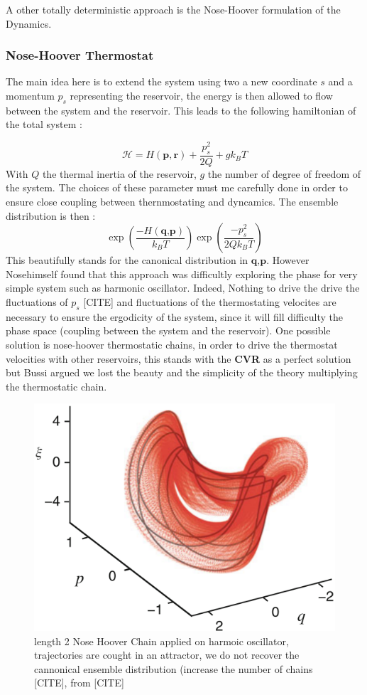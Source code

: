 \documentclass[ansiapaper]{report}
\begin{document}
\begin{multicols}{3}
A other totally deterministic approach is the Nose-Hoover formulation of the Dynamics.

\subsubsection{Nose-Hoover Thermostat}
The main idea here is to extend the system using two a new coordinate $s$ and a momentum $p_s$ representing the reservoir, the energy is then allowed to flow between the system and the reservoir. This leads to the following hamiltonian of the total system :

$$\mathcal{H} = H(\textbf{p}, \textbf{r}) + \frac{p_s^2}{2Q} + gk_BT$$
With $Q$ the thermal inertia of the reservoir, $g$ the number of degree of freedom of the system. The choices of these parameter must me carefully done in order to ensure close coupling between thernmostating and dyncamics. The ensemble distribution is then :
$$\exp(\frac{-H(\textbf{q,p})}{k_BT}) \exp(\frac{-p_s^2}{2Qk_BT})$$
This beautifully stands for the canonical distribution in $\textbf{q,p}$. However Nosehimself found that this approach was difficultly exploring the phase for very simple system such as harmonic oscillator. Indeed, 
Nothing to drive the drive the fluctuations of $p_s$ [CITE] and fluctuations of the thermostating velocites are necessary to ensure the ergodicity of the system, since it will fill difficulty the phase space (coupling between the system and the reservoir). 
One possible solution is nose-hoover thermostatic chains, in order to drive the thermostat velocities with other reservoirs, this stands with the \textbf{CVR} as a perfect solution but Bussi argued we lost the beauty and the simplicity of the theory multiplying the thermostatic chain.

\begin{figure}[H]
    \begin{center}
        \includegraphics[width=1\linewidth]{./figures/NoseHooverChain.png}
    \end{center}
    \caption{length 2 Nose Hoover Chain applied on harmoic oscillator, trajectories are cought in an attractor, we do not recover the cannonical ensemble distribution (increase the number of chains [CITE], from [CITE]}\label{fig:NH-chain}
\end{figure}


\end{multicols}
\end{document}
